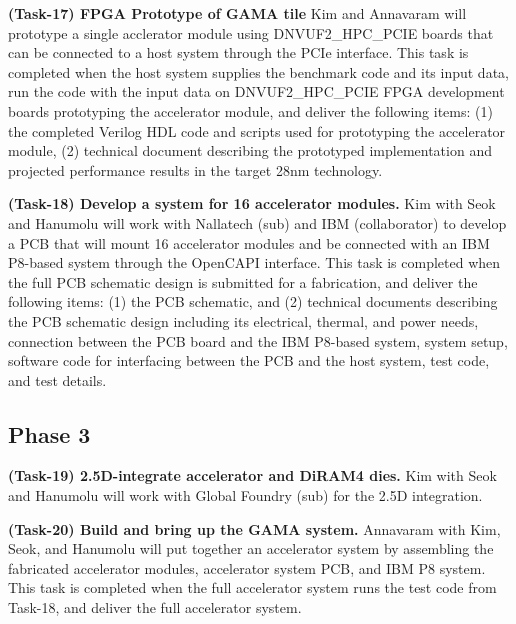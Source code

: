 \noindent
\textbf{(Task-17) FPGA Prototype of GAMA tile}
Kim and Annavaram will prototype a single acclerator module using DNVUF2\_HPC\_PCIE boards that can be connected to a host system through the PCIe interface.
This task is completed when the host system supplies the benchmark code and its input data, run the code with the input data on DNVUF2\_HPC\_PCIE FPGA development boards prototyping the accelerator module, and deliver the following items:
(1) the completed Verilog HDL code and scripts used for prototyping the accelerator module,  
(2) technical document describing the prototyped implementation and projected performance results in the target 28nm technology.


\noindent
\textbf{(Task-18) Develop a system for 16 accelerator modules.}
Kim with Seok and Hanumolu will work with Nallatech (sub) and IBM (collaborator) to develop a PCB that will mount 16 accelerator modules and be connected with an IBM P8-based system through the OpenCAPI interface.
This task is completed when the full PCB schematic design is submitted for a fabrication, and deliver the following items:
(1) the PCB schematic, and
(2) technical documents describing the PCB schematic design including its electrical, thermal, and power needs, connection between the PCB board and the IBM P8-based system, 
system setup, software code for interfacing between the PCB and the host system, test code, and test details. 


\noindent
\subsection{Phase 3}

\noindent
\textbf{(Task-19) 2.5D-integrate accelerator and DiRAM4 dies.}
Kim with Seok and Hanumolu will work with Global Foundry (sub) for the 2.5D integration.


\noindent
\textbf{(Task-20) Build and bring up the GAMA system.}
Annavaram with Kim, Seok, and Hanumolu will put together an accelerator system by assembling
the fabricated accelerator modules, accelerator system PCB, and IBM P8 system.
This task is completed when the full accelerator system runs the test code from Task-18, and deliver the full accelerator system.


